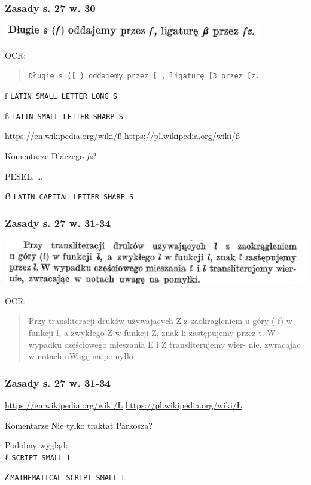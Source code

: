 \documentclass[pdfpagemode=UseNone]{beamer}
\newcommand\stpl[1]{{\JunicodePolish\colorbox{black!15}{#1}}}
\begin{document}
\begin{frame}
  \frametitle{Zasady s. 27 w. 30}
  \includegraphics[width=\hsize]{img/Zasady27-30}

  OCR:\\
  \begin{quote}
  \texttt{Długie s ([ ) oddajemy przez [ , ligaturę [3 przez [z.}
\end{quote}

  {\stpl{ſ}}
    \texttt{LATIN SMALL LETTER LONG S}

    {\stpl{ß}}
    \texttt{LATIN SMALL LETTER SHARP S}

    \url{https://en.wikipedia.org/wiki/ß}
    \url{https://pl.wikipedia.org/wiki/ß}

    \begin{block}{Komentarze}
      Dlaczego \textit{ſz}?

      PESEL, \ldots

      \stpl{ẞ} \texttt{LATIN CAPITAL LETTER SHARP S}
    \end{block}
    
\end{frame}

\begin{frame}
  \frametitle{Zasady s. 27 w. 31-34}
  \includegraphics[width=\hsize]{img/Zasady27-31_34}

  OCR:
  \begin{quote}
Przy transliteracji druków używajacych Z z zaokragleniem
u góry ( f) w funkcji ł, a zwykłego Z w funkcji Z, znak li zastępujemy
przez t. W wypadku częściowego mieszania E i Z transliterujemy wier-
nie, zwracajac w notach uWagę na pomyłki.
\end{quote}
\end{frame}


\begin{frame}
  \frametitle{Zasady s. 27 w. 31-34}

  \url{https://en.wikipedia.org/wiki/Ł}
  \url{https://pl.wikipedia.org/wiki/Ł}
  
  \begin{block}{Komentarze}
      Nie tylko traktat Parkosza?

      Podobny wygląd:\\
      
      {ℓ} \texttt{SCRIPT SMALL L}

      {𝓁} \texttt{MATHEMATICAL SCRIPT SMALL L}
      
    \end{block}
\end{frame}
\end{document}
